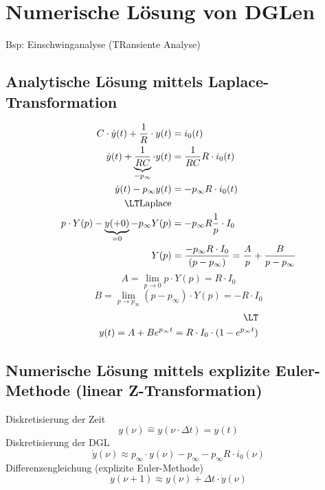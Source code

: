 \section{Numerische Lösung von DGLen}
Bsp: Einschwinganalyse (TRansiente Analyse)


\subsection{Analytische Lösung mittels Laplace-Transformation}
\begin{equation}
\begin{split}
C\cdot\dot{y}(t) + \frac{1}{R}\cdot y(t) &= i_0(t)\\
\dot{y}(t) + \underbrace{\frac{1}{RC}}_{-p_\infty}\cdot y(t) &= \frac{1}{RC}R\cdot i_0(t)\\
\dot{y}(t) - p_\infty y(t) &= -p_\infty R\cdot i_0(t)\\
\LT \text{Laplace}\\
p\cdot Y(p) - \underbrace{y(+0)}_{=0} - p_\infty Y(p) &= -p_\infty R\frac{1}{p}\cdot I_0\\
Y(p) &= \frac{-p_\infty R\cdot I_0}{(p-p_\infty)} = \frac{A}{p} + \frac{B}{p-p_\infty}
\end{split}
\end{equation}
\begin{equation}
A = \lim\limits_{p\rightarrow 0} p\cdot Y(p) = R\cdot I_0
\end{equation}
\begin{equation}
B = \lim\limits_{p\rightarrow p_\infty} (p-p_\infty)\cdot Y(p) = -R\cdot I_0
\end{equation}
\begin{equation}
\begin{split}
\LT\\
y(t) = A + B e^{p_\infty t} = R\cdot I_0\cdot (1-e^{p_\infty t})
\end{split}
\end{equation}

\subsection{Numerische Lösung mittels explizite Euler-Methode (linear Z-Transformation)}
Diskretisierung der Zeit
\begin{equation}
y(\nu)\hat{=} y(\nu\cdot\Delta t) = y(t)
\end{equation}
Diskretisierung der DGL
\begin{equation}
\dot{y}(\nu)\approx p_\infty\cdot y(\nu) - p_\infty - p_\infty R\cdot i_0(\nu)
\end{equation}
Differenzengleichung (explizite Euler-Methode)
\begin{equation}
y(\nu+1)\approx y(\nu) + \Delta t\cdot\dot{y}(\nu)
\end{equation}

